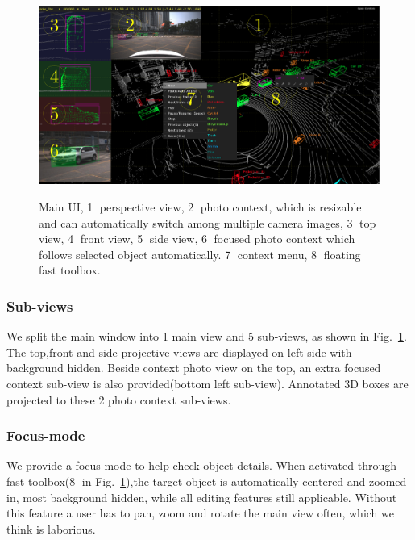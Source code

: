 \documentclass[letterpaper, 10 pt, conference]{ieeeconf}  %
\begin{document}
\begin{figure}[!t]
	\centering	
	\includegraphics[width=\linewidth]{./figures/main-ui}\\
	\caption{Main UI, \textcircled{1} perspective view, \textcircled{2}  photo context, which is resizable and can automatically switch among multiple camera images, \textcircled{3}  top view, \textcircled{4}  front view, \textcircled{5}  side view, \textcircled{6}  focused photo context which follows selected object automatically. \textcircled{7}  context menu, \textcircled{8}  floating fast toolbox.}
	\label{fig:main-ui}
\end{figure}

\subsubsection{Sub-views}
\label{section:sub-views}
We split the main window into 1 main view and 5 sub-views, as shown in Fig.~\ref{fig:main-ui}. The top,front and side projective views are displayed on left side with background hidden. Beside context photo view on the top, an extra focused context sub-view is also provided(bottom left sub-view). Annotated 3D boxes are projected to these 2 photo context sub-views.




\subsubsection{Focus-mode}
We provide a focus mode to help check object details. When activated through fast toolbox(\textcircled{8} in Fig.~\ref{fig:main-ui}),the target object is automatically centered and zoomed in, most background hidden, while all editing features still applicable. Without this feature a user has to pan,  zoom and rotate the main view often, which we think is laborious.
\end{document}
